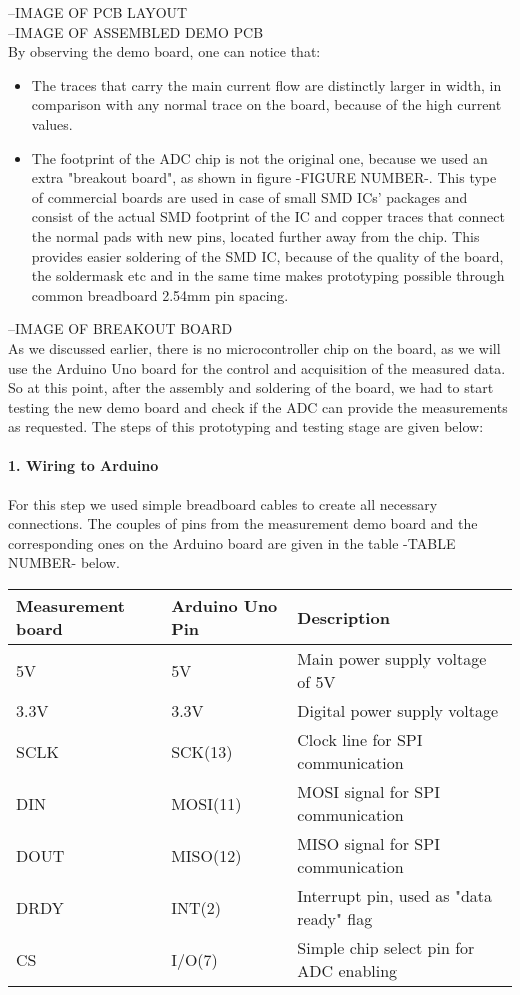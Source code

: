 --IMAGE OF PCB LAYOUT\\

--IMAGE OF ASSEMBLED DEMO PCB\\

By observing the demo board, one can notice that:

\begin{itemize}
    \item The traces that carry the main current flow are distinctly larger in width, in comparison with any normal trace on the board, because of the high current values.
    \item The footprint of the ADC chip is not the original one, because we used an extra "breakout board", as shown in figure -FIGURE NUMBER-. This type of commercial boards are used in case of small SMD ICs' packages and consist of the actual SMD footprint of the IC and copper traces that connect the normal pads with new pins, located further away from the chip. This provides easier soldering of the SMD IC, because of the quality of the board, the soldermask etc and in the same time makes prototyping possible through common breadboard 2.54mm pin spacing.
\end{itemize} 

--IMAGE OF BREAKOUT BOARD\\

As we discussed earlier, there is no microcontroller chip on the board, as we will use the Arduino Uno board for the control and acquisition of the measured data. So at this point, after the assembly and soldering of the board, we had to start testing the new demo board and check if the ADC can provide the measurements as requested. The steps of this prototyping and testing stage are given below:

\paragraph{1. Wiring to Arduino\\}
For this step we used simple breadboard cables to create all necessary connections. The couples of pins from the measurement demo board and the corresponding ones on the Arduino board are given in the table -TABLE NUMBER- below.

\begin{center}
\begin{tabular}{ l l l } 
 Measurement board & Arduino Uno Pin & Description \\ \hline
 5V & 5V & Main power supply voltage of 5V \\ 
 3.3V & 3.3V & Digital power supply voltage \\
 SCLK & SCK(13) & Clock line for SPI communication\\
 DIN & MOSI(11) & MOSI signal for SPI communication\\
 DOUT & MISO(12) & MISO signal for SPI communication\\
 DRDY & INT(2) & Interrupt pin, used as "data ready" flag\\
 CS & I/O(7) & Simple chip select pin for ADC enabling\\
\end{tabular}
\end{center}

